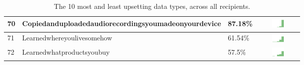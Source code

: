 \begin{table}[t]
\begin{center}
\begin{tabular}{| p{0.5cm} | p{7cm} | p{1cm} | c |}
70 & Copiedanduploadedaudiorecordingsyoumadeonyourdevice & 87.18\% & \includegraphics[width = 2cm, height = 0.5cm]{../copiedanduploadedaudiorecordingsyoumadeonyourdeviceFRIENDS} \\ \hline 
71 & Learnedwhereyoulivesomehow & 61.54\% & \includegraphics[width = 2cm, height = 0.5cm]{../learnedwhereyoulivesomehowFRIENDS} \\ \hline 
72 & Learnedwhatproductsyoubuy & 57.5\% & \includegraphics[width = 2cm, height = 0.5cm]{../learnedwhatproductsyoubuyFRIENDS} \\ \hline 
\hline
\end{tabular}
\caption{The 10 most and least upsetting data types, across all recipients.}
\label{top10}
\end{center}
\end{table}
